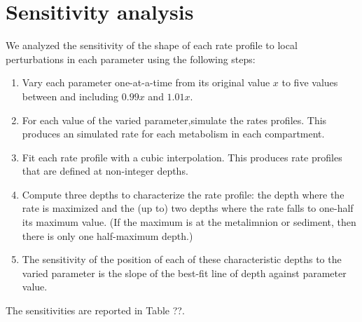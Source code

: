 \documentclass{report}
\begin{document}
\section{Sensitivity analysis}
We analyzed the sensitivity of the shape of each rate profile to local perturbations in each parameter using the following steps:

\begin{enumerate}
\item Vary each parameter one-at-a-time from its original value $x$ to five values between and including $0.99x$ and $1.01x$.
\item For each value of the varied parameter,simulate the rates profiles. This produces an simulated rate for each metabolism in each compartment.
\item Fit each rate profile with a cubic interpolation. This produces rate profiles that are defined at non-integer depths.
\item Compute three depths to characterize the rate profile: the depth where the rate is maximized and the (up to) two depths where the rate falls to one-half its maximum value. (If the maximum is at the metalimnion or sediment, then there is only one half-maximum depth.)
\item The sensitivity of the position of each of these characteristic depths to the varied parameter is the slope of the best-fit line of depth against parameter value.
\end{enumerate}

The sensitivities are reported in Table ??.



\end{document}
